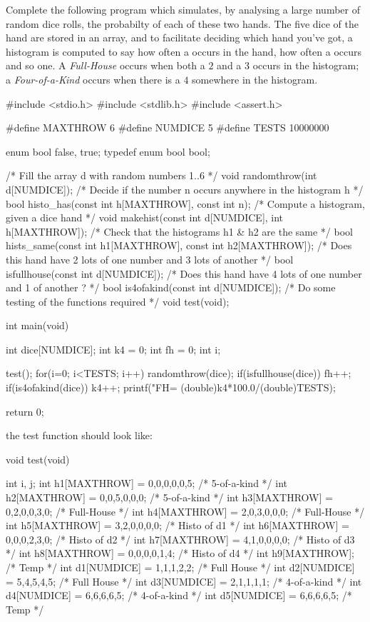 \begin{exercise}
Complete the following program which simulates, by analysing a large number of random dice rolls, the probabilty of each of these two hands.
The five dice of the hand are stored in an array, and to facilitate deciding which hand you've got, a histogram is computed to say how often a  occurs in the hand, how often a  occurs and so one. A {\it Full-House} occurs when both a $2$ and a $3$ occurs in the histogram; a {\it Four-of-a-Kind} occurs when there is a $4$ somewhere in the histogram.
{\small
\begin{codesnippet}
#include <stdio.h>
#include <stdlib.h>
#include <assert.h>

#define MAXTHROW 6
#define NUMDICE 5
#define TESTS 10000000

enum bool {false, true};
typedef enum bool bool;

/* Fill the array d with random numbers 1..6 */
void randomthrow(int d[NUMDICE]);
/* Decide if the number n occurs anywhere in the histogram h */
bool histo_has(const int h[MAXTHROW], const int n);
/* Compute a histogram, given a dice hand */
void makehist(const int d[NUMDICE], int h[MAXTHROW]);
/* Check that the histograms h1 & h2 are the same */
bool hists_same(const int h1[MAXTHROW], const int h2[MAXTHROW]);
/* Does this hand have 2 lots of one number and 3 lots of another */
bool isfullhouse(const int d[NUMDICE]);
/* Does this hand have 4 lots of one number and 1 of another ? */
bool is4ofakind(const int d[NUMDICE]);
/* Do some testing of the functions required */
void test(void);

int main(void)
{

   int dice[NUMDICE];
   int k4 = 0;
   int fh = 0;
   int i;

   test();
   for(i=0; i<TESTS; i++){
      randomthrow(dice);
      if(isfullhouse(dice)){
        fh++;
      }
      if(is4ofakind(dice)){
        k4++;
      }
   }
   printf("FH=%
                                       (double)k4*100.0/(double)TESTS);

   return 0;
}
\end{codesnippet}
}

the test function should look like:
{\small
\begin{codesnippet}
void test(void)
{
   int i, j;
   int h1[MAXTHROW] = {0,0,0,0,0,5}; /* 5-of-a-kind */
   int h2[MAXTHROW] = {0,0,5,0,0,0}; /* 5-of-a-kind */
   int h3[MAXTHROW] = {0,2,0,0,3,0}; /* Full-House  */
   int h4[MAXTHROW] = {2,0,3,0,0,0}; /* Full-House  */
   int h5[MAXTHROW] = {3,2,0,0,0,0}; /* Histo of d1 */
   int h6[MAXTHROW] = {0,0,0,2,3,0}; /* Histo of d2 */
   int h7[MAXTHROW] = {4,1,0,0,0,0}; /* Histo of d3 */
   int h8[MAXTHROW] = {0,0,0,0,1,4}; /* Histo of d4 */
   int h9[MAXTHROW];                 /* Temp        */
   int d1[NUMDICE]  = {1,1,1,2,2};   /* Full House  */
   int d2[NUMDICE]  = {5,4,5,4,5};   /* Full House  */
   int d3[NUMDICE]  = {2,1,1,1,1};   /* 4-of-a-kind */
   int d4[NUMDICE]  = {6,6,6,6,5};   /* 4-of-a-kind */
   int d5[NUMDICE]  = {6,6,6,6,5};   /* Temp        */

}
\end{codesnippet}}
\end{exercise}
